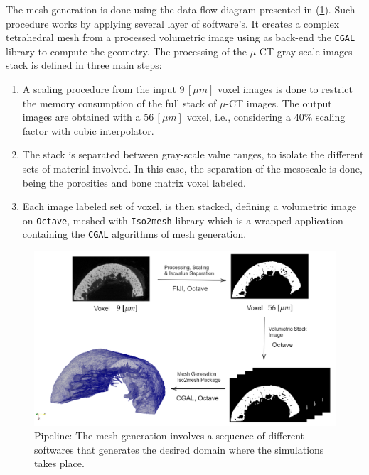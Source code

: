 The mesh generation is done using the data-flow diagram presented in (\ref{DiagramMeshGeneration}). Such procedure works by applying several layer of software's. It creates a complex tetrahedral mesh from a processed volumetric image using as back-end the \texttt{CGAL} library to compute the geometry. 
The processing of the $\mu$-CT gray-scale images stack is defined in three main steps:
\begin{enumerate}
    \item A scaling procedure from the input $9 \, [\mu m]$ voxel images is done to restrict the memory consumption of the full stack of $\mu$-CT images. The output images are obtained with a $56 \, [\mu m]$ voxel, i.e., considering a $40 \%$ scaling factor with cubic interpolator.
    \item The stack is separated between gray-scale value ranges, to isolate the different sets of material involved. In this case, the separation of the mesoscale is done, being the porosities and bone matrix voxel labeled.
    \item Each image labeled set of voxel, is then stacked, defining a volumetric image on \texttt{Octave}, meshed with \texttt{Iso2mesh} library which is a wrapped application containing the \texttt{CGAL} algorithms of mesh generation.
\end{enumerate}
\begin{figure}[!h]
	\centering
	\includegraphics[scale=.5]{images/ImgExt/DiagramMeshGeneration.png}
	\caption{Pipeline: The mesh generation involves a sequence of different softwares that generates the desired domain where the simulations takes place.}
	\label{DiagramMeshGeneration}
\end{figure} 

